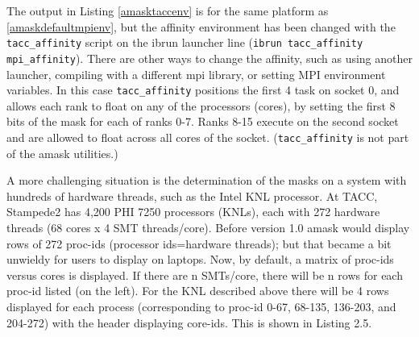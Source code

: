 \documentclass[10pt,a4paper]{report}
\begin{document}
The output in Listing \ref{amasktaccenv} is for the same platform as 
\ref{amaskdefaultmpienv}, but the affinity environment has been changed with 
the \verb+tacc_affinity+ script on the ibrun launcher line (\verb+ibrun tacc_affinity mpi_affinity+).
There are other ways to 
change the affinity, such as using another launcher, compiling with 
a different mpi library, or setting MPI environment variables.  In this case 
\verb+tacc_affinity+ positions the first 4 task on socket 0, and allows 
each rank to float on any of the processors (cores), by setting the first 
8 bits of the mask for each of ranks 0-7.  Ranks 8-15
execute on the second socket and are allowed to float across all cores 
of the socket.  (\verb+tacc_affinity+ is not part of the amask utilities.)


A more challenging situation is the determination of the masks on a system with 
hundreds of hardware threads, such as the Intel KNL processor.  At TACC, Stampede2 
has 4,200 PHI 7250 processors (KNLs), each with 272 hardware threads (68 cores x 
4 SMT threads/core).  Before version 1.0  amask would display rows of 272 proc-ids 
(processor ids=hardware threads); but that became a bit unwieldy for users to 
display on laptops.  Now, by default, a matrix of proc-ids versus cores is displayed.
If there are n SMTs/core, there will be n rows for each proc-id listed (on the left).
For the KNL described above there will be 4 rows displayed for each process 
(corresponding to  proc-id {0-67}, {68-135}, {136-203}, and {204-272}) with the header displaying core-ids.  
This is shown in Listing 2.5.
\end{document}
